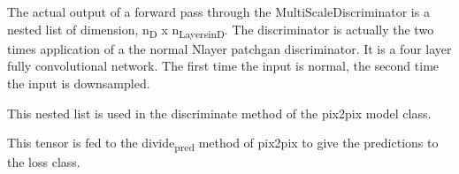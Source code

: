 \documentclass{memoir}
\begin{document}
The actual output of a forward pass through the MultiScaleDiscriminator is a
nested list of dimension, n\textsubscript{D} x n\textsubscript{Layers}\textsubscript{in}\textsubscript{D}. The discriminator is actually the
two times application of a the normal Nlayer patchgan discriminator. It is a
four layer fully convolutional network. The first time the input is normal, the
second time the input is downsampled.

This nested list is used in the discriminate method of the pix2pix model class.

This tensor is fed to the divide\textsubscript{pred} method of pix2pix to give the predictions to the loss class.



\end{document}
